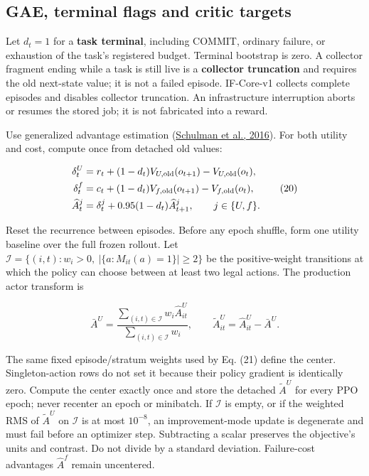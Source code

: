 \documentclass[10pt,a4paper]{article}
\begin{document}
\hypertarget{gae-terminal-flags-and-critic-targets}{%
\subsection{GAE, terminal flags and critic
targets}\label{gae-terminal-flags-and-critic-targets}}

Let \(d_t=1\) for a \textbf{task terminal}, including COMMIT, ordinary
failure, or exhaustion of the task's registered budget. Terminal
bootstrap is zero. A collector fragment ending while a task is still
live is a \textbf{collector truncation} and requires the old next-state
value; it is not a failed episode. IF-Core-v1 collects complete episodes
and disables collector truncation. An infrastructure interruption aborts
or resumes the stored job; it is not fabricated into a reward.

Use generalized advantage estimation
(\href{https://arxiv.org/abs/1506.02438}{Schulman et al., 2016}). For
both utility and cost, compute once from detached old values:

\[
\begin{aligned}
\delta_t^U&=r_t+(1-d_t)V_{U,\rm old}(o_{t+1})-V_{U,\rm old}(o_t),\\
\delta_t^f&=c_t+(1-d_t)V_{f,\rm old}(o_{t+1})-V_{f,\rm old}(o_t),\\
\widehat A_t^j&=\delta_t^j+0.95(1-d_t)\widehat A_{t+1}^j,
\qquad j\in\{U,f\}.
\end{aligned}
\tag{20}
\]

Reset the recurrence between episodes. Before any epoch shuffle, form one
utility baseline over the full frozen rollout. Let
\(\mathcal I=\{(i,t):w_i>0,\ |\{a:M_{it}(a)=1\}|\ge2\}\) be the
positive-weight transitions at which the policy can choose between at
least two legal actions. The production actor transform is

\[
\bar A^U=\frac{\sum_{(i,t)\in\mathcal I}w_i\widehat A_{it}^U}
{\sum_{(i,t)\in\mathcal I}w_i},
\qquad
\widetilde A_{it}^U=\widehat A_{it}^U-\bar A^U.
\]

The same fixed episode/stratum weights used by Eq. (21) define the
center. Singleton-action rows do not set it because their policy gradient
is identically zero. Compute the center exactly once and store the
detached \(\widetilde A^U\) for every PPO epoch; never recenter an epoch
or minibatch. If \(\mathcal I\) is empty, or if the weighted RMS of
\(\widetilde A^U\) on \(\mathcal I\) is at most \(10^{-8}\), an
improvement-mode update is degenerate and must fail before an optimizer
step. Subtracting a scalar preserves the objective's units and contrast.
Do not divide by a standard deviation. Failure-cost advantages
\(\widehat A^f\) remain uncentered.
\end{document}
